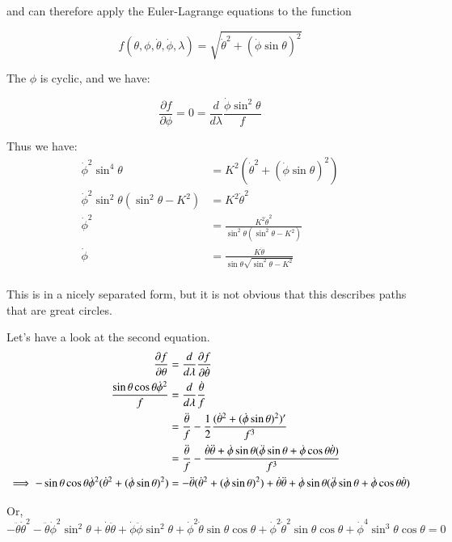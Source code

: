 \documentclass{article}
\newcommand{\dottheta}[0]{\dot{\theta}}
\newcommand{\ddottheta}[0]{\ddot{\theta}}
\newcommand{\dotphi}[0]{\dot{\phi}}
\newcommand{\ddotphi}[0]{\ddot{\phi}}
\newcommand{\PD}[2]{\frac{\partial {#2}}{\partial {#1}}}
\begin{document}
and can therefore apply the Euler-Lagrange equations to the function

\begin{equation*}
f(\theta, \phi, \dottheta, \dotphi, \lambda) = 
\sqrt{\dottheta^2 + ( \dotphi \sin\theta )^2 }
\end{equation*}

The $\phi$ is cyclic, and we have:

\begin{equation*}
\PD{\phi}{f} = 0 = \frac{d}{d\lambda} \frac{\dotphi \sin^2\theta}{f}
\end{equation*}

Thus we have:
\begin{align*}
\dotphi^2 \sin^4\theta &= K^2 \left(\dottheta^2 + ( \dotphi \sin\theta )^2 \right) \\
\dotphi^2 \sin^2\theta( \sin^2\theta - K^2 ) &= K^2 \dottheta^2 \\
\dotphi^2 
&= \frac{K^2 \dottheta^2 }{ \sin^2\theta ( \sin^2\theta - K^2 ) } \\
\dotphi
&= \frac{K \dottheta }{ \sin\theta \sqrt{ \sin^2\theta - K^2 } } \\
\end{align*}

This is in a nicely separated form, but it is not obvious that this describes paths that are great circles.

Let's have a look at the second equation.
\begin{align*}
\PD{\theta}{f} &= \frac{d}{d\lambda} \PD{\dottheta}{f} \\
\frac{\sin\theta\cos\theta \dotphi^2}{f}
&= \frac{d}{d\lambda} \frac{\dottheta}{f} \\
&= \frac{\ddottheta}{f} - \inv{2} \frac{ (\dottheta^2 + ( \dotphi \sin\theta )^2 )' }{f^3} \\
&= \frac{\ddottheta}{f} - \frac{ \dottheta \ddottheta + \dotphi \sin\theta ( \ddotphi \sin\theta + \dotphi \cos\theta \dottheta ) }{f^3} \\
\implies
-\sin\theta\cos\theta \dotphi^2 ( \dottheta^2 + ( \dotphi \sin\theta )^2 )
&= -\ddottheta ( \dottheta^2 + ( \dotphi \sin\theta )^2 )
   + \dottheta \ddottheta 
   + \dotphi \sin\theta ( \ddotphi \sin\theta + \dotphi \cos\theta \dottheta ) \\
\end{align*}

Or,
\begin{equation*}
- \ddottheta \dottheta^2 
- \ddottheta \dotphi^2 \sin^2\theta 
+ \dottheta \ddottheta 
+ \dotphi \ddotphi \sin^2\theta
+ \dotphi^2 \dottheta \sin\theta \cos\theta
+ \dotphi^2 \dottheta^2 \sin\theta \cos\theta 
+ \dotphi^4 \sin^3\theta \cos\theta 
= 0
\end{equation*}
\end{document}
